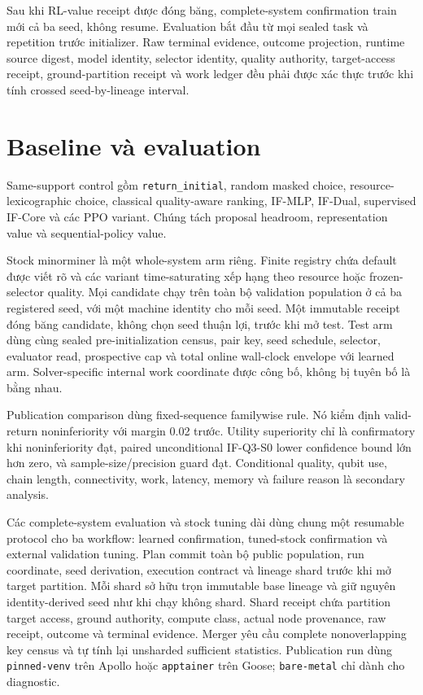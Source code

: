 \documentclass[
  vietnamese,
  10pt,
  a4paper,
]{article}
\begin{document}
Sau khi RL-value receipt được đóng băng, complete-system confirmation
train mới cả ba seed, không resume. Evaluation bắt đầu từ mọi sealed
task và repetition trước initializer. Raw terminal evidence, outcome
projection, runtime source digest, model identity, selector identity,
quality authority, target-access receipt, ground-partition receipt và
work ledger đều phải được xác thực trước khi tính crossed
seed-by-lineage interval.

\section{Baseline và evaluation}\label{baseline-vuxe0-evaluation}

Same-support control gồm \texttt{return\_initial}, random masked choice,
resource-lexicographic choice, classical quality-aware ranking, IF-MLP,
IF-Dual, supervised IF-Core và các PPO variant. Chúng tách proposal
headroom, representation value và sequential-policy value.

Stock minorminer là một whole-system arm riêng. Finite registry chứa
default được viết rõ và các variant time-saturating xếp hạng theo
resource hoặc frozen-selector quality. Mọi candidate chạy trên toàn bộ
validation population ở cả ba registered seed, với một machine identity
cho mỗi seed. Một immutable receipt đóng băng candidate, không chọn seed
thuận lợi, trước khi mở test. Test arm dùng cùng sealed
pre-initialization census, pair key, seed schedule, selector, evaluator
read, prospective cap và total online wall-clock envelope với learned
arm. Solver-specific internal work coordinate được công bố, không bị
tuyên bố là bằng nhau.

Publication comparison dùng fixed-sequence familywise rule. Nó kiểm định
valid-return noninferiority với margin 0.02 trước. Utility superiority
chỉ là confirmatory khi noninferiority đạt, paired unconditional
IF-Q3-S0 lower confidence bound lớn hơn zero, và sample-size/precision
guard đạt. Conditional quality, qubit use, chain length, connectivity,
work, latency, memory và failure reason là secondary analysis.

Các complete-system evaluation và stock tuning dài dùng chung một
resumable protocol cho ba workflow: learned confirmation, tuned-stock
confirmation và external validation tuning. Plan commit toàn bộ public
population, run coordinate, seed derivation, execution contract và
lineage shard trước khi mở target partition. Mỗi shard sở hữu trọn
immutable base lineage và giữ nguyên identity-derived seed như khi chạy
không shard. Shard receipt chứa partition target access, ground
authority, compute class, actual node provenance, raw receipt, outcome
và terminal evidence. Merger yêu cầu complete nonoverlapping key census
và tự tính lại unsharded sufficient statistics. Publication run dùng
\texttt{pinned-venv} trên Apollo hoặc \texttt{apptainer} trên Goose;
\texttt{bare-metal} chỉ dành cho diagnostic.
\end{document}
